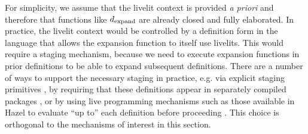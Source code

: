 For simplicity, we assume that the livelit context is provided \emph{a priori} and therefore
that functions like $d_\text{expand}$ are already closed and fully elaborated.
In practice, the livelit context would be controlled by a definition form in the language
that allows the expansion function to itself use livelits.
This would require a staging mechanism,
because we need to execute expansion functions in prior definitions to be able to
expand subsequent definitions.
There are a number of ways to support the necessary staging in practice, e.g.
via explicit staging primitives \cite{DBLP:conf/icfp/Flatt02},
by requiring that these definitions appear in separately compiled packages \cite{TLMs},
or by using live
programming mechanisms such as those available in Hazel
to evaluate ``up to'' each definition before proceeding \cite{HazelnutLive}.
This choice is orthogonal to the mechanisms of interest in this section.

